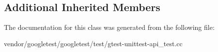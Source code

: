 \subsection*{Additional Inherited Members}


The documentation for this class was generated from the following file\+:\begin{DoxyCompactItemize}
\item 
vendor/googletest/googletest/test/gtest-\/unittest-\/api\+\_\+test.\+cc\end{DoxyCompactItemize}
